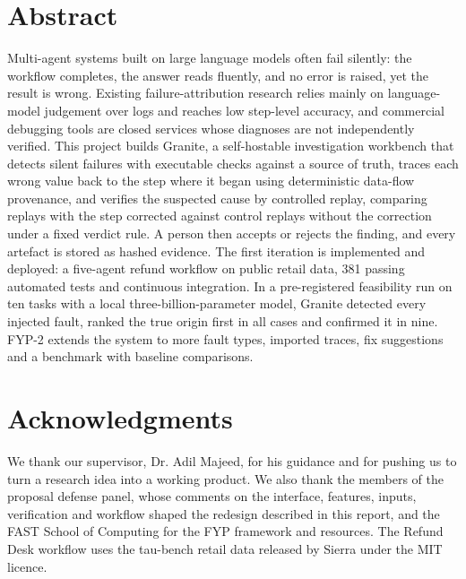 \documentclass{fast-nuces-bs}
\begin{document}
\chapter*{Abstract}

Multi-agent systems built on large language models often fail silently: the workflow completes, the answer reads fluently, and no error is raised, yet the result is wrong. Existing failure-attribution research relies mainly on language-model judgement over logs and reaches low step-level accuracy, and commercial debugging tools are closed services whose diagnoses are not independently verified. This project builds Granite, a self-hostable investigation workbench that detects silent failures with executable checks against a source of truth, traces each wrong value back to the step where it began using deterministic data-flow provenance, and verifies the suspected cause by controlled replay, comparing replays with the step corrected against control replays without the correction under a fixed verdict rule. A person then accepts or rejects the finding, and every artefact is stored as hashed evidence. The first iteration is implemented and deployed: a five-agent refund workflow on public retail data, 381 passing automated tests and continuous integration. In a pre-registered feasibility run on ten tasks with a local three-billion-parameter model, Granite detected every injected fault, ranked the true origin first in all cases and confirmed it in nine. FYP-2 extends the system to more fault types, imported traces, fix suggestions and a benchmark with baseline comparisons.

\chapter*{Acknowledgments}

We thank our supervisor, Dr. Adil Majeed, for his guidance and for pushing us to turn a research idea into a working product. We also thank the members of the proposal defense panel, whose comments on the interface, features, inputs, verification and workflow shaped the redesign described in this report, and the FAST School of Computing for the FYP framework and resources. The Refund Desk workflow uses the tau-bench retail data released by Sierra under the MIT licence.
\end{document}
